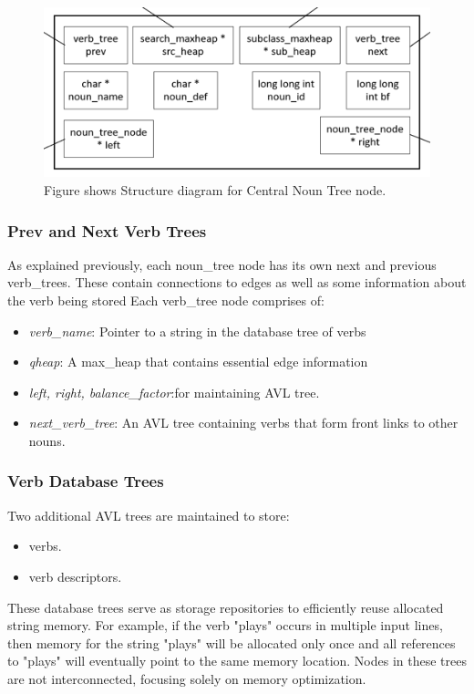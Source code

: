 \documentclass[conference]{IEEEtran}
\begin{document}
\begin{figure}[htbp]
\centering
\includegraphics[width=0.8\linewidth]{fig_2_2.png} %
\caption{Figure shows Structure diagram for Central Noun Tree node.}
\label{fig}
\end{figure}

\subsubsection{\textbf{Prev and Next Verb Trees}}
As explained previously, each noun\_tree node has its own next and previous verb\_trees. These contain connections to edges as well as some information about the verb being stored
Each verb\_tree node comprises of:

\begin{itemize}

    \item \textit{verb\_name}: Pointer to a string in the database tree of verbs
    \item \textit{qheap}: A max\_heap that contains essential edge information
    \item \textit{left, right, balance\_factor}:for maintaining AVL tree. 
    \item \textit{next\_verb\_tree}: An AVL tree containing verbs that form front links to other nouns.
    
\end{itemize}

\subsubsection{\textbf{Verb Database Trees}}
Two additional AVL trees are maintained to store:
\begin{itemize}
    \item verbs.
    \item verb descriptors.
\end{itemize}
These database trees serve as storage repositories to efficiently reuse allocated string memory. 
For example, if the verb "plays" occurs in multiple input lines, then memory for the string "plays" will be allocated only once and all references to "plays" will eventually point to the same memory location. 
Nodes in these trees are not interconnected, focusing solely on memory optimization.
\end{document}
